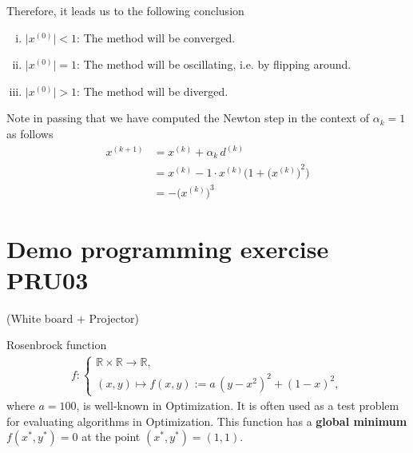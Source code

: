\documentclass[12pt]{article}
\begin{document}
\begin{enumerate}[(i)]
	      \clearpage
	      Therefore, it leads us to the following conclusion
	      \begin{enumerate}[(i)]
		      \item \( \big| x^{(0)} \big| < 1 \): The method will be converged.
		      \item \( \big| x^{(0)} \big| = 1 \): The method will be oscillating, i.e. by flipping around.
		      \item \( \big| x^{(0)} \big| > 1 \): The method will be diverged.
	      \end{enumerate}
	      
	      Note in passing that we have computed the Newton step 
	      in the context of $\alpha_k = 1$ as follows
	      \begin{align}
		      x^{(k+1)}
		       & = x^{(k)} + \alpha_k \, d^{(k)}                                    \\
		       & = x^{(k)} - 1 \cdot x^{(k)} \Bigg(1 + {\Big(x^{(k)}\Big)}^2 \Bigg) \\
		       & = - \Big( x^{(k)} \Big)^3
	      \end{align}
\end{enumerate}

\clearpage
\section{Demo programming exercise PRU03}
 (White board + Projector)
\begin{remarkboxed}
	Rosenbrock function
	\begin{align}
		f:
		\begin{cases}
			\mathbb{R} \times \mathbb{R} \to \mathbb{R}, \\
			(x,y) \mapsto f(x,y) := a\, (y-x^2)^2 + (1-x)^2,
		\end{cases}
	\end{align}
	where $a=100$,
	is well-known in Optimization. It is often used as a test problem 
	for evaluating algorithms in Optimization.
	This function has a \textbf{global minimum}
	$f(x^*,y^*) = 0$ at the point $(x^*,y^*) = (1,1)$.
\end{remarkboxed}


% 
\end{document}
